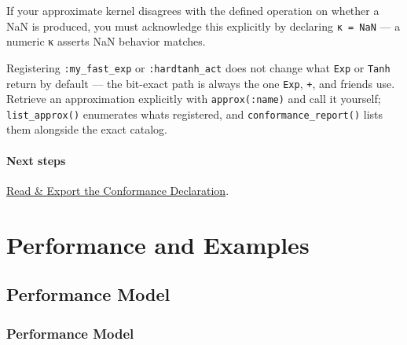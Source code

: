 \begin{tcolorbox}[toptitle=-1mm,bottomtitle=1mm,colback=admonition-note!50!white,colframe=admonition-note,title=\textbf{NaN-mismatching implementations need κ = NaN, not a number}]
If your approximate kernel disagrees with the defined operation on whether a NaN is produced, you must acknowledge this explicitly by declaring \texttt{κ = NaN} — a numeric κ asserts NaN behavior matches.

\end{tcolorbox}


\begin{tcolorbox}[toptitle=-1mm,bottomtitle=1mm,colback=admonition-note!50!white,colframe=admonition-note,title=\textbf{Approximate implementations never enter the default API}]
Registering \texttt{:my\_\allowbreak{}fast\_\allowbreak{}exp} or \texttt{:hardtanh\_\allowbreak{}act} does not change what \texttt{Exp} or \texttt{Tanh} return by default — the bit-exact path is always the one \texttt{Exp}, \texttt{+}, and friends use. Retrieve an approximation explicitly with \texttt{approx(:name)} and call it yourself; \texttt{list\_\allowbreak{}approx()} enumerates what{\textquotesingle}s registered, and \texttt{conformance\_\allowbreak{}report()} lists them alongside the exact catalog.

\end{tcolorbox}


\subsection{Next steps}



\label{3807517405601295309-dup7}{}


\href{workflow\_\allowbreak{}conformance.md}{Read \& Export the Conformance Declaration}.



\part{Performance and Examples}


\chapter{Performance Model}


\section{Performance Model}



